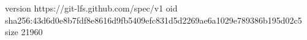 version https://git-lfs.github.com/spec/v1
oid sha256:43d6d0e8b7fdf8e8616d9fb5409efc831d5d2269ae6a1029e789386b195d02c5
size 21960
